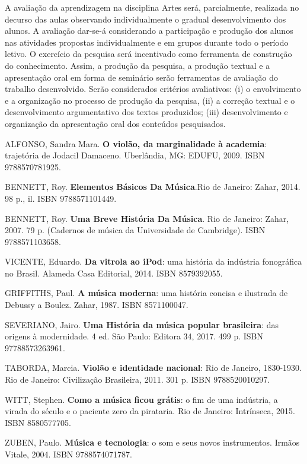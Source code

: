 \begin{pud}
	
	\avaliacao
	A avaliação da aprendizagem na disciplina Artes será, parcialmente, realizada no decurso das aulas observando individualmente o gradual desenvolvimento dos alunos. A avaliação dar-se-á considerando a participação e produção dos alunos nas atividades propostas individualmente e em grupos durante todo o período letivo. O exercício da pesquisa será incentivado como ferramenta de construção do conhecimento. Assim, a produção da pesquisa, a produção textual e a apresentação oral em forma de seminário serão ferramentas de avaliação do trabalho desenvolvido. Serão considerados critérios avaliativos: (i) o envolvimento e a organização no processo de produção da pesquisa, (ii) a correção textual e o desenvolvimento argumentativo dos textos produzidos; (iii) desenvolvimento e organização da apresentação oral dos conteúdos pesquisados. 
	
		
	
	\begin{bibbasica}
			
		\item ALFONSO, Sandra Mara. \textbf{O violão, da marginalidade à academia}: trajetória de Jodacil Damaceno. Uberlândia, MG: EDUFU, 2009. ISBN 9788570781925.
		\item BENNETT, Roy. \textbf{Elementos Básicos Da Música}.Rio de Janeiro: Zahar, 2014. 98 p., il. ISBN 9788571101449. 
		\item BENNETT, Roy. \textbf{Uma Breve História Da Música}. Rio de Janeiro: Zahar, 2007. 79 p. (Cadernos de música da Universidade de Cambridge). ISBN 9788571103658. 
		\item VICENTE, Eduardo. \textbf{Da vitrola ao iPod}: uma história da indústria fonográfica no Brasil. Alameda Casa Editorial, 2014. ISBN 8579392055.
	
	\end{bibbasica}
	
	\begin{bibcomplementar}
    
		\item GRIFFITHS, Paul. \textbf{A música moderna}: uma história concisa e ilustrada de Debussy a Boulez. Zahar, 1987. ISBN 8571100047.
		\item SEVERIANO, Jairo. \textbf{Uma História da música popular brasileira}:  das origens à modernidade. 4 ed. São Paulo: Editora 34, 2017. 499 p. ISBN 97788573263961. 
		\item TABORDA, Marcia. \textbf{Violão e identidade nacional}: Rio de Janeiro, 1830-1930. Rio de Janeiro: Civilização Brasileira, 2011. 301 p. ISBN 9788520010297. 
		\item WITT, Stephen. \textbf{Como a música ficou grátis}: o fim de uma indústria, a virada do século e o paciente zero da pirataria. Rio de Janeiro: Intrínseca, 2015. ISBN 8580577705.
		\item ZUBEN, Paulo. \textbf{Música e tecnologia}: o som e seus novos instrumentos. Irmãos Vitale, 2004. ISBN 9788574071787. 
					
	\end{bibcomplementar}
	
	

\end{pud}


